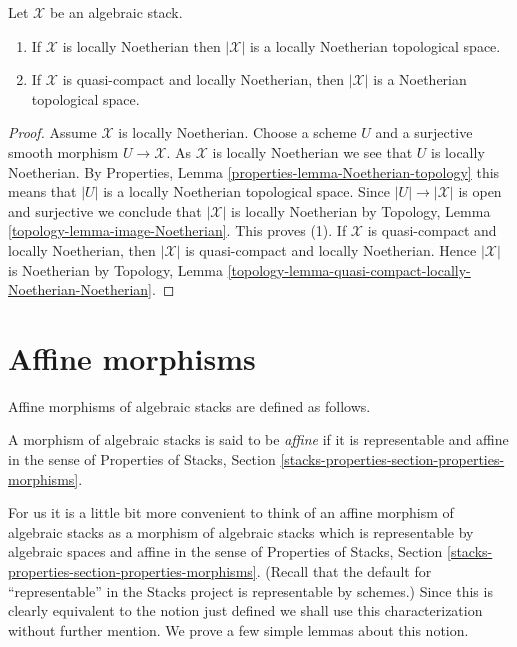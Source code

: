 \begin{lemma}
\label{lemma-Noetherian-topology}
Let $\mathcal{X}$ be an algebraic stack.
\begin{enumerate}
\item If $\mathcal{X}$ is locally Noetherian then $|\mathcal{X}|$
is a locally Noetherian topological space.
\item If $\mathcal{X}$ is quasi-compact and locally Noetherian, then
$|\mathcal{X}|$ is a Noetherian topological space.
\end{enumerate}
\end{lemma}

\begin{proof}
Assume $\mathcal{X}$ is locally Noetherian.
Choose a scheme $U$ and a surjective smooth morphism
$U \to \mathcal{X}$. As $\mathcal{X}$ is locally Noetherian
we see that $U$ is locally Noetherian. By
Properties, Lemma \ref{properties-lemma-Noetherian-topology}
this means that $|U|$ is a locally Noetherian topological space.
Since $|U| \to |\mathcal{X}|$ is open and surjective we conclude that
$|\mathcal{X}|$ is locally Noetherian by
Topology, Lemma \ref{topology-lemma-image-Noetherian}.
This proves (1). If $\mathcal{X}$ is quasi-compact and locally Noetherian,
then $|\mathcal{X}|$ is quasi-compact and locally Noetherian. Hence
$|\mathcal{X}|$ is Noetherian by Topology, Lemma
\ref{topology-lemma-quasi-compact-locally-Noetherian-Noetherian}.
\end{proof}






\section{Affine morphisms}
\label{section-affine}

\noindent
Affine morphisms of algebraic stacks are defined as follows.

\begin{definition}
\label{definition-affine}
A morphism of algebraic stacks is said to be {\it affine}
if it is representable and affine in the sense of
Properties of Stacks, Section
\ref{stacks-properties-section-properties-morphisms}.
\end{definition}

\noindent
For us it is a little bit more convenient to think of an affine
morphism of algebraic stacks as a morphism of algebraic stacks which is
representable by algebraic spaces and affine in the sense of
Properties of Stacks, Section
\ref{stacks-properties-section-properties-morphisms}.
(Recall that the default for ``representable'' in the Stacks project
is representable by schemes.)
Since this is clearly equivalent to the notion just defined we shall
use this characterization without further mention.
We prove a few simple lemmas about this notion.

